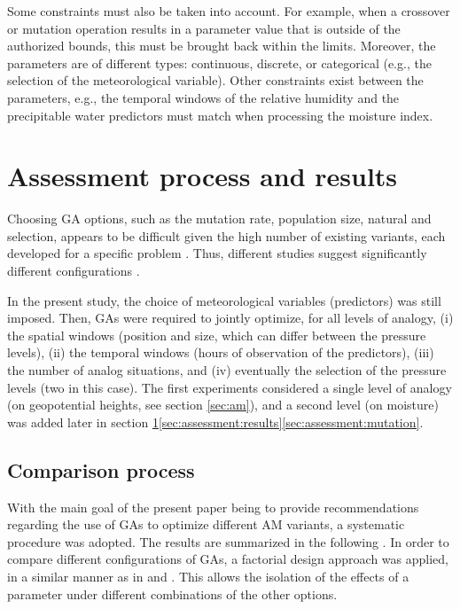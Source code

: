 \documentclass{ametsoc}
\begin{document}
Some constraints must also be taken into account. For example, when a crossover or mutation operation results in a parameter value that is outside of the authorized bounds, this must be brought back within the limits. Moreover, the parameters are of different types: continuous, discrete, or categorical (e.g., the selection of the meteorological variable). Other constraints exist between the parameters, e.g., the temporal windows of the relative humidity and the precipitable water predictors must match when processing the moisture index.


\section{Assessment process and results}
\label{sec:assessment}

Choosing GA options, such as the mutation rate, population size, natural and selection, appears to be difficult given the high number of existing variants, each developed for a specific problem \citep{Haupt2004, Costa2007a}. Thus, different studies suggest significantly different configurations \citep{DeJong1975a, Grefenstette1986, Back1996a, Back1996b}.

In the present study, the choice of meteorological variables (predictors) was still imposed. Then, GAs were required to jointly optimize, for all levels of analogy, (i) the spatial windows (position and size, which can differ between the pressure levels), (ii) the temporal windows (hours of observation of the predictors), (iii) the number of analog situations, and (iv) eventually the selection of the pressure levels (two in this case). The first experiments considered a single level of analogy (on geopotential heights, see section \ref{sec:am}), and a second level (on moisture) was added later in section \ref{sec:assessment}\ref{sec:assessment:results}\ref{sec:assessment:mutation}.


\subsection{Comparison process}

With the main goal of the present paper being to provide recommendations regarding the use of GAs to optimize different AM variants, a systematic procedure was adopted. The results are summarized in the following \citep[see][for the details]{Horton2012a}. In order to compare different configurations of GAs, a factorial design approach was applied, in a similar manner as in \citet{Costa2005a,Costa2007a} and \citet{Mariano2010a}. This allows the isolation of the effects of a parameter under different combinations of the other options.
\end{document}
